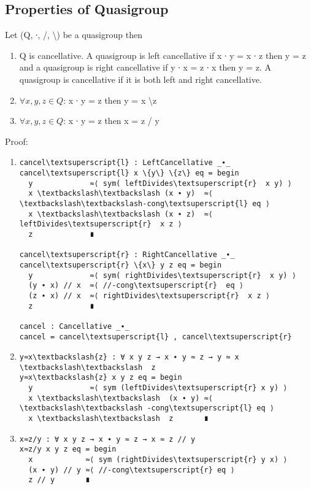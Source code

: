 \subsection{Properties of Quasigroup}
Let (Q, ∙, /, \textbackslash ) be a quasigroup then \\
\begin{enumerate}
\item Q is cancellative. A quasigroup is left cancellative if x ∙ y = x ∙ z then y = z and a quasigroup is right cancellative if y ∙ x = z ∙ x then y = z. A quasigroup is cancellative if it is both left and right cancellative.
\item \(\forall x, y, z \in Q\): x ∙ y = z then y = x \textbackslash z
\item \(\forall x, y, z \in Q\): x ∙ y = z then x = z / y
\end{enumerate}
Proof:
\begin{enumerate}
\item 
\begin{Verbatim}[commandchars=\\\{\},samepage=true]
cancel\textsuperscript{l} : LeftCancellative _∙_
cancel\textsuperscript{l} x \{y\} \{z\} eq = begin
  y             ≈⟨ sym( leftDivides\textsuperscript{r}  x y) ⟩
  x \textbackslash\textbackslash (x ∙ y)  ≈⟨ \textbackslash\textbackslash-cong\textsuperscript{l} eq ⟩
  x \textbackslash\textbackslash (x ∙ z)  ≈⟨ leftDivides\textsuperscript{r}  x z ⟩
  z             ∎

cancel\textsuperscript{r} : RightCancellative _∙_
cancel\textsuperscript{r} \{x\} y z eq = begin
  y             ≈⟨ sym( rightDivides\textsuperscript{r}  x y) ⟩
  (y ∙ x) // x  ≈⟨ //-cong\textsuperscript{r}  eq ⟩
  (z ∙ x) // x  ≈⟨ rightDivides\textsuperscript{r}  x z ⟩
  z             ∎

cancel : Cancellative _∙_
cancel = cancel\textsuperscript{l} , cancel\textsuperscript{r} 
\end{Verbatim}

\item 
\begin{Verbatim}[commandchars=\\\{\},samepage=true]
y≈x\textbackslash{z} : ∀ x y z → x ∙ y ≈ z → y ≈ x \textbackslash\textbackslash  z
y≈x\textbackslash{z} x y z eq = begin
  y             ≈⟨ sym (leftDivides\textsuperscript{r} x y) ⟩
  x \textbackslash\textbackslash  (x ∙ y) ≈⟨ \textbackslash\textbackslash -cong\textsuperscript{l} eq ⟩
  x \textbackslash\textbackslash  z       ∎
\end{Verbatim}

\item 
\begin{Verbatim}[commandchars=\\\{\},samepage=true]
x≈z/y : ∀ x y z → x ∙ y ≈ z → x ≈ z // y
x≈z/y x y z eq = begin
  x            ≈⟨ sym (rightDivides\textsuperscript{r} y x) ⟩
  (x ∙ y) // y ≈⟨ //-cong\textsuperscript{r} eq ⟩
  z // y       ∎
\end{Verbatim}
\end{enumerate}

